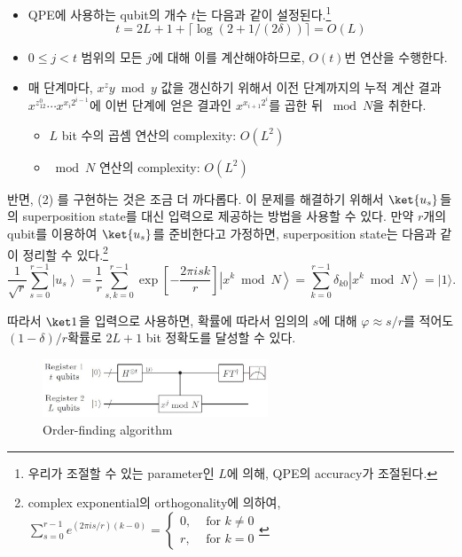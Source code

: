 \begin{itemize}
  \item \*QPE에 사용하는 qubit의 개수 $t$는 다음과 같이 설정된다.\footnote{우리가 조절할 수 있는 parameter인 $L$에 의해, QPE의 accuracy가 조절된다. }
  \begin{equation*}
    t=2 L+1+\lceil\log (2+1 /(2 \delta))\rceil=O(L)
  \end{equation*}
  \item $0\le j < t$ 범위의 모든 $j$에 대해 이를 계산해야하므로, $O(t)$번 연산을 수행한다.
  \item 매 단계마다, $x^{z}y \bmod y$ 값을 갱신하기 위해서 이전 단계까지의 누적 계산 결과 $x^{z_12^0} \cdots x^{x_i 2^{i-1}}$에 이번 단계에 얻은 결과인 $x^{x_{i+1} 2^{i}}$를 곱한 뒤 $\bmod N$을 취한다.
  \begin{itemize}
    \item $L$ bit 수의 곱셈 연산의 complexity: $O(L^2)$
    \item $\bmod N$ 연산의 complexity: $O(L^2)$
  \end{itemize}
\end{itemize}

\vspace{1em}

반면, (2) 를 구현하는 것은 조금 더 까다롭다. 이 문제를 해결하기 위해서 $\ket{u_s}$들의 superposition state를 대신 입력으로 제공하는 방법을 사용할 수 있다. 만약 $r$개의 qubit를 이용하여 $\ket{u_s}$를 준비한다고 가정하면, superposition state는 다음과 같이 정리할 수 있다.\footnote{complex exponential의 orthogonality에 의하여, $\sum_{s=0}^{r-1} e^{(2 \pi i s / r )(k-0)}=\left\{\begin{array}{lll}
  0, & \text { for } k \neq 0 \\
  r, & \text { for } k=0
  \end{array}\right.$}
\begin{equation*}
  \frac{1}{\sqrt{r}} \sum_{s=0}^{r-1}\left|u_s\right\rangle=\frac{1}{r} \sum_{s, k=0}^{r-1} \exp \left[-\frac{2 \pi i s k}{r}\right]\left|x^k \bmod N\right\rangle=\sum_{k=0}^{r-1} \delta_{k 0}\left|x^k \bmod N\right\rangle=|1\rangle .
\end{equation*}

따라서 $\ket 1$을 입력으로 사용하면, 확률에 따라서 임의의 $s$에 대해 $\varphi \approx s/r$를 적어도 $(1-\delta)/r$확률로 $2L+1$ bit 정확도를 달성할 수 있다. 

\begin{figure}[h]
  \centering
  \includegraphics[width=0.6\textwidth]{figures/order-finding-circuit.png}
  \caption{Order-finding algorithm \cite{unknown}}
\end{figure}

